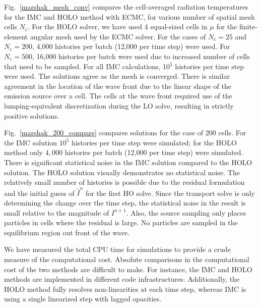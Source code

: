 \documentclass{mc2013}
\begin{document}
Fig.~\ref{marshak_mesh_conv} compares the cell-averaged radiation temperatures  for the
IMC and HOLO method with ECMC, for various number of spatial mesh cells $N_c$.  For the HOLO solver, we have used
4 equal-sized cells in $\mu$ for the finite-element angular mesh used by the ECMC solver. For the cases
of $N_c=25$ and $N_c=200$, 4,000 histories per batch (12,000 per time step)  were used.  For $N_c=500$, 16,000 histories per batch were used due to increased number of cells that
need to be sampled.  For all IMC calculations, 10$^5$ histories per time step were used. The solutions agree as the mesh is converged.  There is
similar agreement in the location of the wave front due to the linear shape of the emission source over a cell.  The cells
at the wave front required use of the lumping-equivalent discretization during the LO
solve, resulting in strictly positive solutions.


Fig.~\ref{marshak_200_compare} compares solutions
for the case of 200 cells.  For the IMC solution $10^5$ histories per time step were
simulated; for the HOLO method only $4,000$ histories per batch
(12,000 per time step) were simulated. There is significant statistical noise in the IMC solution
compared to the HOLO solution.  The HOLO solution visually demonstrates no statistical noise.  The relatively small number of histories is possible
due to the residual formulation and the initial guess of $\tilde{I}^{n}$ for the
first HO solve.  Since the transport solve is only determining the change over the
time step, the statistical noise in the result is small relative to the magnitude of
$I^{n+1}$.  Also, the source sampling only places particles in cells where the residual is
large.  No particles are sampled in the equilibrium region out front of the wave. 

We have measured the total CPU time for simulations to provide a crude measure of the
computational cost.  Absolute comparisons in the computational cost of the two
methods are difficult to make. For instance, the IMC and HOLO methods are implemented
in different code infrastructures. Additionally, the HOLO method fully resolves
non-linearities at each time step, whereas IMC is using a single linearized step with
lagged opacities.  
\end{document}
